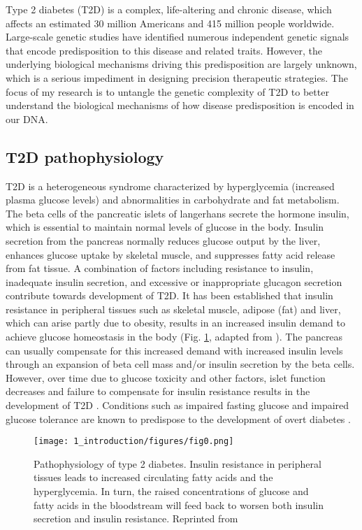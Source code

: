 ﻿Type 2 diabetes (T2D) is a complex, life-altering and chronic disease, which affects an estimated 30 million Americans and 415 million people worldwide. Large-scale genetic studies have identified numerous independent genetic signals that encode predisposition to this disease and related traits. However, the underlying biological mechanisms driving this predisposition are largely unknown, which is a serious impediment in designing precision therapeutic strategies. The focus of my research is to untangle the genetic complexity of T2D to better understand the biological mechanisms of how disease predisposition is encoded in our DNA.


\subsection{T2D pathophysiology}
T2D is a heterogeneous syndrome characterized by hyperglycemia (increased plasma glucose levels) and abnormalities in carbohydrate and fat metabolism. The beta cells of the pancreatic islets of langerhans secrete the hormone insulin, which is essential to maintain normal levels of glucose in the body. Insulin secretion from the pancreas normally reduces glucose output by the liver, enhances glucose uptake by skeletal muscle, and suppresses fatty acid release from fat tissue. A combination of factors including resistance to insulin, inadequate insulin secretion, and excessive or inappropriate glucagon secretion contribute towards development of T2D. It has been established that insulin resistance in peripheral tissues such as skeletal muscle, adipose (fat) and liver, which can arise partly due to obesity, results in an increased insulin demand to achieve glucose homeostasis in the body \cite{stumvollTypeDiabetesPrinciples2005} (Fig. \ref{fig:ci_f0}, adapted from \cite{stumvollTypeDiabetesPrinciples2005}). The pancreas can usually compensate for this increased demand with increased insulin levels through an expansion of beta cell mass and/or insulin secretion by the beta cells. However, over time due to glucose toxicity and other factors, islet function decreases and failure to compensate for insulin resistance results in the development of T2D \cite{kellerGeneExpressionNetwork2008}. Conditions such as impaired fasting glucose and impaired glucose tolerance are known to predispose to the development of overt diabetes \cite{stumvollTypeDiabetesPrinciples2005}.


\begin{figure}
        \centering
        \texttt{[image: 1\_introduction/figures/fig0.png]}
        \caption{Pathophysiology of type 2 diabetes. Insulin resistance in peripheral tissues leads to increased circulating fatty acids and the hyperglycemia. In turn, the raised concentrations of glucose and fatty acids in the bloodstream will feed back to worsen both insulin secretion and insulin resistance. Reprinted from \cite{stumvollTypeDiabetesPrinciples2005}}
        \label{fig:ci_f0}
\end{figure}


